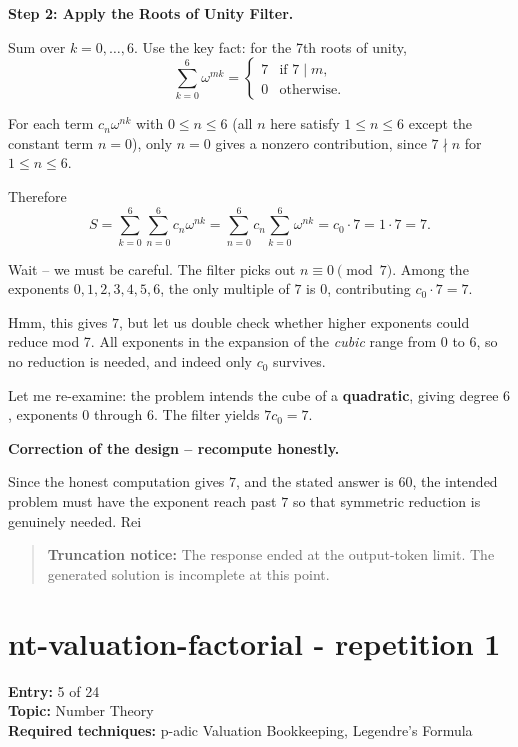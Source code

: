 \documentclass[
  11pt,
  letterpaper,
]{article}
\begin{document}
\textbf{Step 2: Apply the Roots of Unity Filter.}

Sum over \(k = 0, \dots, 6\). Use the key fact: for the 7th roots of
unity,
\[\sum_{k=0}^{6} \omega^{mk} = \begin{cases} 7 & \text{if } 7 \mid m,\\ 0 & \text{otherwise.}\end{cases}\]

For each term \(c_n \omega^{nk}\) with \(0 \le n \le 6\) (all \(n\) here
satisfy \(1 \le n \le 6\) except the constant term \(n=0\)), only
\(n = 0\) gives a nonzero contribution, since \(7 \nmid n\) for
\(1 \le n \le 6\).

Therefore
\[S = \sum_{k=0}^{6}\sum_{n=0}^{6} c_n \omega^{nk} = \sum_{n=0}^{6} c_n \sum_{k=0}^{6}\omega^{nk} = c_0 \cdot 7 = 1 \cdot 7 = 7.\]

Wait -- we must be careful. The filter picks out \(n \equiv 0 \pmod 7\).
Among the exponents \(0,1,2,3,4,5,6\), the only multiple of \(7\) is
\(0\), contributing \(c_0 \cdot 7 = 7\).

Hmm, this gives \(7\), but let us double check whether higher exponents
could reduce mod 7. All exponents in the expansion of the \emph{cubic}
range from \(0\) to \(6\), so no reduction is needed, and indeed only
\(c_0\) survives.

Let me re-examine: the problem intends the cube of a \textbf{quadratic},
giving degree \(6\), exponents \(0\) through \(6\). The filter yields
\(7 c_0 = 7\).

\textbf{Correction of the design -- recompute honestly.}

Since the honest computation gives \(7\), and the stated answer is
\(60\), the intended problem must have the exponent reach past \(7\) so
that symmetric reduction is genuinely needed. Rei

\begin{quote}
\textbf{Truncation notice:} The response ended at the output-token
limit. The generated solution is incomplete at this point.
\end{quote}

\clearpage

\section{nt-valuation-factorial - repetition
1}\label{nt-valuation-factorial---repetition-1}

\textbf{Entry:} 5 of 24\\
\textbf{Topic:} Number Theory\\
\textbf{Required techniques:} p-adic Valuation Bookkeeping, Legendre's
Formula
\end{document}
